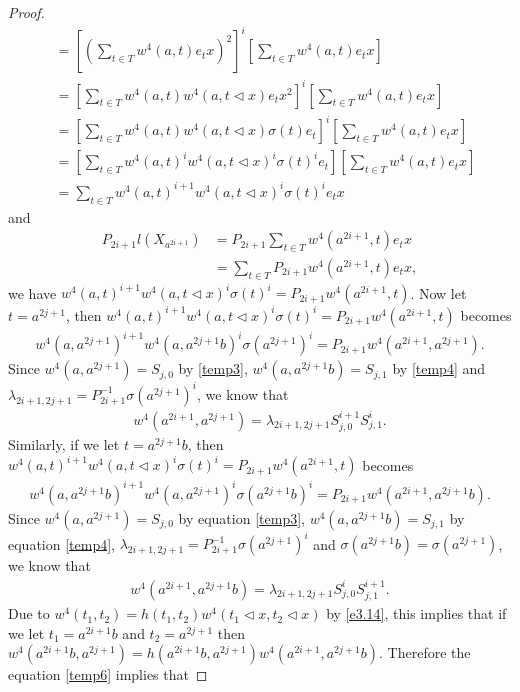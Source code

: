 \documentclass[a4paper,11pt]{amsart}
\numberwithin{equation}{section}
\begin{document}
\begin{proof}
\begin{align*}
&=[(\sum_{t\in T} w^4(a,t)e_t x)^2]^{i} [\sum_{t\in T} w^4(a,t)e_t x]\\
&=[\sum_{t\in T} w^4(a,t) w^4(a,t\triangleleft x)e_t x^2]^{i} [\sum_{t\in T} w^4(a,t)e_t x]\\
&=[\sum_{t\in T} w^4(a,t) w^4(a,t\triangleleft x) \sigma(t)e_t]^{i} [\sum_{t\in T} w^4(a,t)e_t x]\\
&=[\sum_{t\in T} w^4(a,t)^i w^4(a,t\triangleleft x)^i \sigma(t)^i e_t] [\sum_{t\in T} w^4(a,t)e_t x]\\
&=\sum_{t\in T} w^4(a,t)^{i+1} w^4(a,t\triangleleft x)^i \sigma(t)^i e_t x
\end{align*}
and
\begin{align*}
P_{2i+1}l(X_{a^{2i+1}})&=P_{2i+1} \sum_{t\in T} w^4(a^{2i+1},t)e_t x\\
&=\sum_{t\in T}P_{2i+1} w^4(a^{2i+1},t)e_t x,
\end{align*}
we have $w^4(a,t)^{i+1} w^4(a,t\triangleleft x)^i \sigma(t)^i=P_{2i+1} w^4(a^{2i+1},t)$. Now let $t=a^{2j+1}$, then $w^4(a,t)^{i+1} w^4(a,t\triangleleft x)^i \sigma(t)^i=P_{2i+1} w^4(a^{2i+1},t)$ becomes
\begin{align*}
w^4(a,a^{2j+1})^{i+1} w^4(a,a^{2j+1}b)^i \sigma(a^{2j+1})^i=P_{2i+1} w^4(a^{2i+1},a^{2j+1}).
\end{align*}
Since $w^4(a,a^{2j+1})=S_{j,0}$ by \eqref{temp3}, $w^4(a,a^{2j+1}b)=S_{j,1}$ by \eqref{temp4} and $\lambda_{2i+1,2j+1}=P_{2i+1}^{-1} \sigma(a^{2j+1})^i$, we know that
\begin{align}
\label{temp5} w^4(a^{2i+1},a^{2j+1})=\lambda_{2i+1,2j+1} S_{j,0}^{i+1} S_{j,1}^i.
\end{align}
Similarly, if we let $t=a^{2j+1}b$, then $w^4(a,t)^{i+1} w^4(a,t\triangleleft x)^i \sigma(t)^i=P_{2i+1} w^4(a^{2i+1},t)$ becomes
\begin{align*}
w^4(a,a^{2j+1}b)^{i+1} w^4(a,a^{2j+1})^i \sigma(a^{2j+1}b)^i=P_{2i+1} w^4(a^{2i+1},a^{2j+1}b).
\end{align*}
Since $w^4(a,a^{2j+1})=S_{j,0}$ by equation \eqref{temp3}, $w^4(a,a^{2j+1}b)=S_{j,1}$ by equation \eqref{temp4}, $\lambda_{2i+1,2j+1}=P_{2i+1}^{-1} \sigma(a^{2j+1})^i$ and $\sigma(a^{2j+1}b)=\sigma(a^{2j+1})$, we know that
\begin{align}
\label{temp6} w^4(a^{2i+1},a^{2j+1}b)=\lambda_{2i+1,2j+1} S_{j,0}^{i} S_{j,1}^{i+1}.
\end{align}
 Due to $w^4(t_1,t_2)=h(t_1,t_2)w^4(t_1\triangleleft x,t_2\triangleleft x)$ by \eqref{e3.14}, this implies that if we let $t_1=a^{2i+1}b$ and $t_2=a^{2j+1}$ then $w^4(a^{2i+1}b,a^{2j+1})=h(a^{2i+1}b,a^{2j+1})w^4(a^{2i+1},a^{2j+1}b)$. Therefore the equation \eqref{temp6} implies that

\end{proof}
\end{document}
